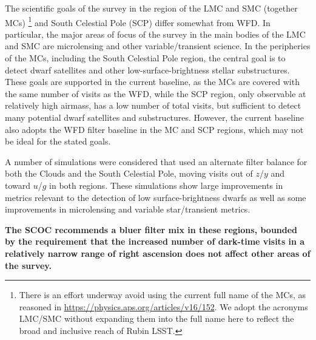 The scientific goals of the survey in the region of the LMC and SMC (together MCs) \footnote{There is an effort underway avoid using the current full name of the MCs, as reasoned in \url{https://physics.aps.org/articles/v16/152}.  We adopt the acronyms LMC/SMC without expanding them into the full name here to reflect the broad and inclusive reach of Rubin LSST.} 
and South Celestial Pole (SCP) differ somewhat from WFD. In particular, the major areas of focus of the survey in the main bodies of the LMC and SMC are microlensing and other variable/transient science. In the peripheries of the MCs, including the South Celestial Pole region, the central goal is to detect dwarf satellites and other low-surface-brightness stellar substructures.
These goals are supported in the current baseline, as the MCs are covered with the same number of visits as the WFD, while the SCP region, only observable at relatively high airmass, has a low number of total visits, but sufficient to detect many potential dwarf satellites and substructures. However, the current baseline also adopts the WFD filter baseline in the MC and SCP regions, which may not be ideal for the stated goals.


A number of simulations were considered that used an alternate filter balance for both the Clouds and the South Celestial Pole, moving visits out of $z$/$y$ and toward $u$/$g$ in both regions. These simulations show large improvements in metrics relevant to the detection of low surface-brightness dwarfs as well as some improvements in microlensing and variable star/transient metrics. 

{\bf The SCOC recommends a bluer filter mix in these regions, bounded by the requirement that the increased number of dark-time visits in a relatively narrow range of right ascension does not affect other areas of the survey.} 


